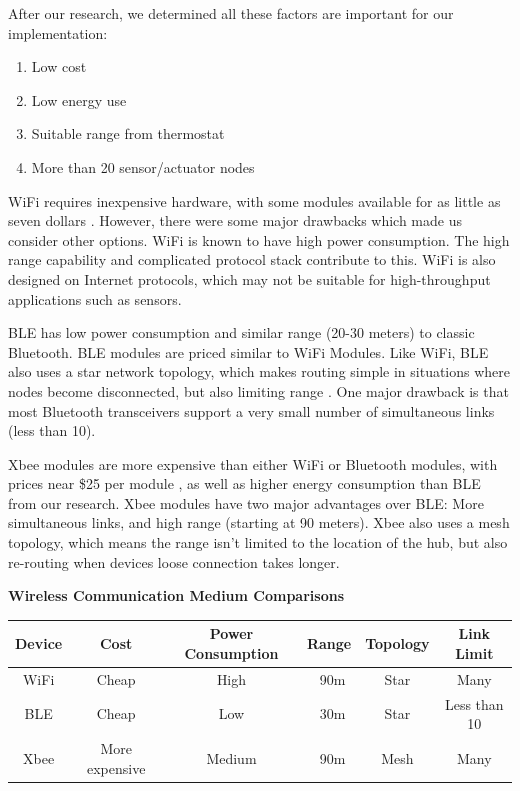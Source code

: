 \documentclass{article}
\begin{document}
After our research, we determined all these factors are important for our implementation:
\begin{enumerate}
    \item Low cost
    \item Low energy use
    \item Suitable range from thermostat
    \item More than 20 sensor/actuator nodes
\end{enumerate}

WiFi requires inexpensive hardware, with some modules available for as little as seven dollars \cite{r11}. However, there were some major drawbacks which made us consider other options. WiFi is known to have high power consumption. The high range capability and complicated protocol stack contribute to this. WiFi is also designed on Internet protocols, which may not be suitable for high-throughput applications such as sensors.

\gls{BLE} has low power consumption and similar range (20-30 meters) to classic Bluetooth. \gls{BLE} modules are priced similar to WiFi Modules. Like WiFi, \gls{BLE} also uses a star network topology, which makes routing simple in situations where nodes become disconnected, but also limiting range \cite{r13}. One major drawback is that most Bluetooth transceivers support a very small number of simultaneous links (less than 10).

Xbee modules are more expensive than either WiFi or Bluetooth modules, with prices near \$25 per module \cite{r12}, as well as higher energy consumption than \gls{BLE} from our research. Xbee modules have two major advantages over \gls{BLE}: More simultaneous links, and high range (starting at 90 meters). Xbee also uses a mesh topology, which means the range isn't limited to the location of the hub, but also re-routing when devices loose connection takes longer.
\pagebreak

\begin{flushleft}
\large
{}
\textbf{Wireless Communication Medium Comparisons}
\end{flushleft}

\begin{tabular}{| c || c | c | c | c | c |}
    \hline
    Device & Cost & Power Consumption & Range & Topology & Link Limit \\
    \hline
    \hline
    WiFi & Cheap & High & ~90m & Star & Many \\
    \gls{BLE} & Cheap & Low & ~30m & Star & Less than 10 \\
    Xbee & More expensive & Medium & ~90m & Mesh & Many \\
    \hline
\end{tabular}
\end{document}
